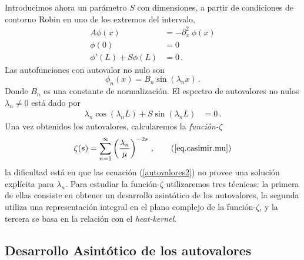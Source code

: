 Introducimos ahora un parámetro $S$ con dimensiones, a partir de condiciones de contorno Robin en uno de los extremos del intervalo,
\begin{equation}
\begin{aligned}
    A \phi (x) &= - \partial ^2 _x \ \phi (x)  \\[5pt]
    \phi (0) &= 0 \\[5pt]
    \phi ' (L) + S \phi (L) &= 0 \, .
\end{aligned}
\end{equation}
Las autofunciones con autovalor no nulo son
\begin{equation}
\phi _n (x) = 
B _n \sin ( \lambda _n x ) \, .
\end{equation}
Donde $B_n$ es una constante de normalización. El espectro de autovalores no nulos $\lambda _n \neq 0 $ está dado por
\begin{align}
    \lambda _n   \cos( \lambda _n L) +  S \sin( \lambda _n L) &= 0
    \, . \label{autovalores2} 
\end{align}
Una vez obtenidos los autovalores, calcularemos la {\it función-$\zeta$}
\begin{equation}
    \zeta (s) =  \sum_{n = 1} ^{ \infty } \left( \frac{\lambda _n}{\mu } \right) ^ {-2 s} \, ,
    \tag{\ref{eq.casimir.mu}}
\end{equation}
la dificultad está en que las ecuación (\ref{autovalores2}) no provee una solución explícita para $\lambda _n$. Para estudiar la función-$\zeta$ utilizaremos tres técnicas: la primera de ellas consiste en obtener un desarrollo asintótico de los autovalores, la segunda utiliza una representación integral en el plano complejo de la función-$\zeta$, y la tercera se basa en la relación con el {\it heat-kernel}. 

\subsection{Desarrollo Asintótico de los autovalores}{\label{seq.asin}}

